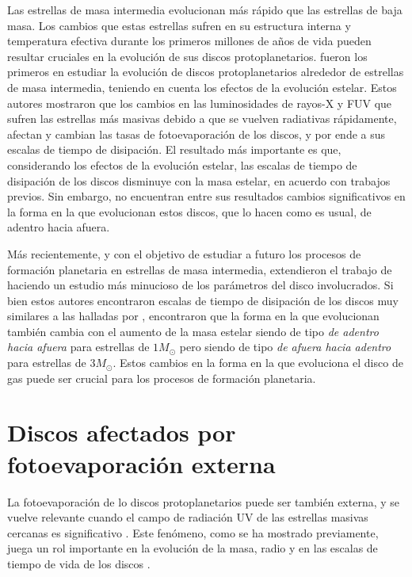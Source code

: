 \documentclass[baaa]{baaa}
\begin{document}
Las estrellas de masa intermedia evolucionan m\'as r\'apido que las estrellas de baja masa. Los cambios que estas estrellas sufren en su estructura interna y temperatura efectiva durante los primeros millones de a\~nos de vida pueden resultar cruciales en la evoluci\'on de sus discos protoplanetarios. \citet{Kunitomo2021} fueron los primeros en estudiar la evoluci\'on de discos protoplanetarios alrededor de estrellas de masa intermedia, teniendo en cuenta los efectos de la evoluci\'on estelar. Estos autores mostraron que los cambios en las luminosidades de rayos-X y FUV que sufren las estrellas m\'as masivas debido a que se vuelven radiativas r\'apidamente, afectan y cambian las tasas de fotoevaporaci\'on de los discos, y por ende a sus escalas de tiempo de disipaci\'on. El resultado m\'as importante es que, considerando los efectos de la evoluci\'on estelar, las escalas de tiempo de disipaci\'on de los discos disminuye con la masa estelar, en acuerdo con trabajos previos. Sin embargo, no encuentran entre sus resultados cambios significativos en la forma en la que evolucionan estos discos, que lo hacen como es usual, de adentro hacia afuera.

M\'as recientemente, y con el objetivo de estudiar a futuro los procesos de formaci\'on planetaria en estrellas de masa intermedia, \citet{Ronco2024} extendieron el trabajo de \citet{Kunitomo2021} haciendo un estudio m\'as minucioso de los par\'ametros del disco involucrados. Si bien estos autores encontraron escalas de tiempo de disipaci\'on de los discos muy similares a las halladas por \citet{Kunitomo2021}, encontraron que la forma en la que evolucionan tambi\'en cambia con el aumento de la masa estelar siendo de tipo \textit{de adentro hacia afuera} para estrellas de $1M_\odot$ pero siendo de tipo \textit{de afuera hacia adentro} para estrellas de $3M_\odot$. Estos cambios en la forma en la que evoluciona el disco de gas puede ser crucial para los procesos de formaci\'on planetaria.

\section{Discos afectados por fotoevaporaci\'on externa}

La fotoevaporaci\'on de lo discos protoplanetarios puede ser tambi\'en externa, y se vuelve relevante cuando el campo de radiación UV de las estrellas masivas cercanas es significativo \citep[ver por ejemplo][]{Andrews2022}. Este fen\'omeno, como se ha mostrado previamente, juega un rol importante en la evoluci\'on de la masa, radio y en las escalas de tiempo de vida de los discos \citep{Ansdell2017,Eisner2018, Winter2020}.
\end{document}

